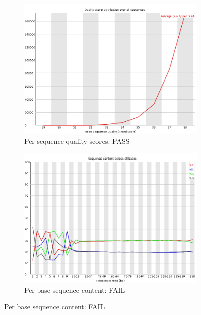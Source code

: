 \documentclass{article}
\begin{document}
\begin{figure}[htbp]
\begin{subfigure}{0.45\linewidth}
\includegraphics[width=\linewidth]{04-R1.qfilter_fastqc/Images/per_sequence_quality.png}
\caption{Per sequence quality scores: PASS}
\end{subfigure}
\begin{subfigure}{0.45\linewidth}
\includegraphics[width=\linewidth]{04-R1.qfilter_fastqc/Images/per_base_sequence_content.png}
\caption{Per base sequence content: FAIL}
\end{subfigure}
\end{figure}
\end{document}
